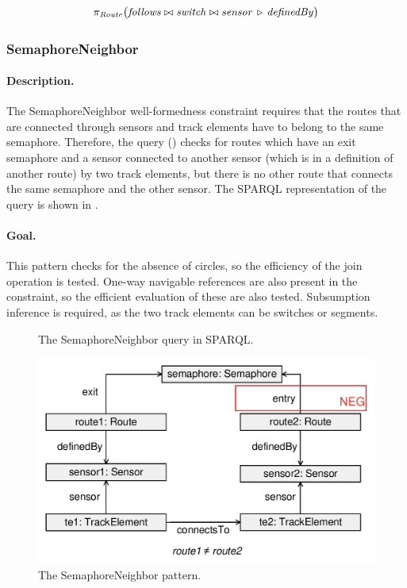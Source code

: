 \[
\pi_{\mathit{Route}} \big( \mathit{follows} \bowtie \mathit{switch} \bowtie \mathit{sensor} \, \triangleright \, \mathit{definedBy} \big)
\]

\subsubsection{SemaphoreNeighbor}

\paragraph{Description.} The \textsf{SemaphoreNeighbor} well-formedness constraint requires that the routes that are connected through sensors and track elements have to belong to the same semaphore. Therefore, the query () checks for routes which have an exit semaphore and a sensor connected to another sensor (which is in a definition of another route) by two track elements, but there is no other route that connects the same semaphore and the other sensor. The SPARQL representation of the query is shown in .

\paragraph{Goal.} This pattern checks for the absence of circles, so the efficiency of the join operation is tested. One-way navigable references are also present in the constraint, so the efficient evaluation of these are also tested. Subsumption inference is required, as the two track elements can be switches or segments.

\begin{figure}[htb]
\centering
\begin{minipage}{0.9\textwidth}
  { \alignListing
    }
  \caption{The \textsf{SemaphoreNeighbor} query in SPARQL.}
  \label{lst:semaphoreneighbor-sparql}
\end{minipage}
\end{figure}

\begin{figure}[htb]
		\centering
		\includegraphics[scale=0.4]{figures/pattern-semaphoreneighbor}
		\caption{The \textsf{SemaphoreNeighbor} pattern.}
		\label{fig:pattern-semaphoreneighbor}
\end{figure}

